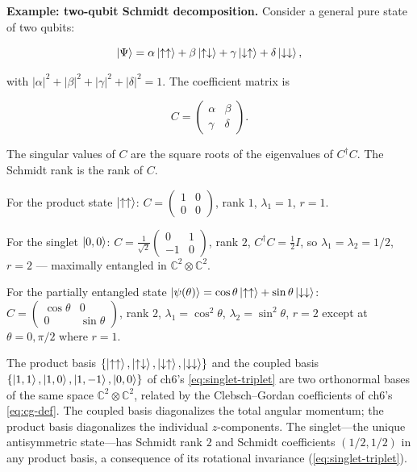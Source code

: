 \medskip\noindent\textbf{Example: two-qubit Schmidt decomposition.}
Consider a general pure state of two qubits:
\begin{linenomath}
\begin{equation}
\ket{\Psi} = \alpha\ket{\uparrow\uparrow} + \beta\ket{\uparrow\downarrow} + \gamma\ket{\downarrow\uparrow} + \delta\ket{\downarrow\downarrow},
\end{equation}
\end{linenomath}
with $\lvert\alpha\rvert^2 + \lvert\beta\rvert^2 + \lvert\gamma\rvert^2 + \lvert\delta\rvert^2 = 1$. The coefficient matrix is
\begin{linenomath}
\begin{equation}
C =
\begin{pmatrix}
\alpha & \beta \\
\gamma & \delta
\end{pmatrix}.
\end{equation}
\end{linenomath}
The singular values of $C$ are the square roots of the eigenvalues of $C^\dagger C$. The Schmidt rank is the rank of $C$.

For the product state $\ket{\uparrow\uparrow}$: $C = \begin{pmatrix}1&0\\0&0\end{pmatrix}$, rank $1$, $\lambda_1 = 1$, $r = 1$.

For the singlet $\ket{0,0}$: $C = \frac{1}{\sqrt{2}}\begin{pmatrix}0&1\\-1&0\end{pmatrix}$, rank $2$, $C^\dagger C = \frac12 I$, so $\lambda_1 = \lambda_2 = 1/2$, $r = 2$ --- maximally entangled in $\mathbb{C}^2 \otimes \mathbb{C}^2$.

For the partially entangled state $\ket{\psi(\theta)} = \cos\theta\ket{\uparrow\uparrow} + \sin\theta\ket{\downarrow\downarrow}$: $C = \begin{pmatrix}\cos\theta&0\\0&\sin\theta\end{pmatrix}$, rank $2$, $\lambda_1 = \cos^2\theta$, $\lambda_2 = \sin^2\theta$, $r = 2$ except at $\theta = 0, \pi/2$ where $r = 1$.

The product basis $\{\ket{\uparrow\uparrow}, \ket{\uparrow\downarrow}, \ket{\downarrow\uparrow}, \ket{\downarrow\downarrow}\}$ and the coupled basis $\{\ket{1,1}, \ket{1,0}, \ket{1,-1}, \ket{0,0}\}$ of ch6's \eqref{eq:singlet-triplet} are two orthonormal bases of the same space $\mathbb{C}^2 \otimes \mathbb{C}^2$, related by the Clebsch--Gordan coefficients of ch6's \eqref{eq:cg-def}. The coupled basis diagonalizes the total angular momentum; the product basis diagonalizes the individual $z$-components. The singlet---the unique antisymmetric state---has Schmidt rank $2$ and Schmidt coefficients $(1/2, 1/2)$ in any product basis, a consequence of its rotational invariance (\eqref{eq:singlet-triplet}).

